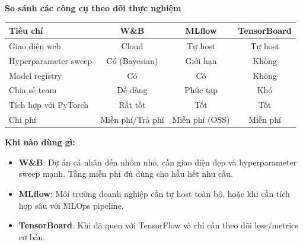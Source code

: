 \begin{mdframed}[style=infobox]
\textbf{So sánh các công cụ theo dõi thực nghiệm}

\begin{center}
\begin{tabular}{lccc}
\hline
\textbf{Tiêu chí}          & \textbf{W\&B}   & \textbf{MLflow} & \textbf{TensorBoard} \\
\hline
Giao diện web              & Cloud           & Tự host          & Tự host              \\
Hyperparameter sweep        & Có (Bayesian)   & Giới hạn         & Không                \\
Model registry              & Có              & Có               & Không                \\
Chia sẻ team               & Dễ dàng         & Phức tạp         & Khó                  \\
Tích hợp với PyTorch        & Rất tốt         & Tốt              & Tốt                  \\
Chi phí                     & Miễn phí/Trả phí & Miễn phí (OSS)  & Miễn phí             \\
\hline
\end{tabular}
\end{center}

\vspace{0.5em}
\textbf{Khi nào dùng gì:}
\begin{itemize}
    \item \textbf{W\&B}: Dự án cá nhân đến nhóm nhỏ, cần giao diện đẹp và hyperparameter sweep mạnh. Tầng miễn phí đủ dùng cho hầu hết nhu cầu.
    \item \textbf{MLflow}: Môi trường doanh nghiệp cần tự host toàn bộ, hoặc khi cần tích hợp sâu với MLOps pipeline.
    \item \textbf{TensorBoard}: Khi đã quen với TensorFlow và chỉ cần theo dõi loss/metrics cơ bản.
\end{itemize}
\end{mdframed}
